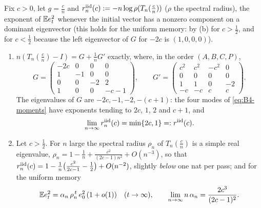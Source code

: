 \begin{proposition}\label{prop:B4-iid-limit}
Fix $c>0$, let $g=\frac cn$ and $r^{\rm iid}_n(c):=-n\log\rho(T_n(\frac cn))$ ($\rho$ the spectral radius), the exponent of $\mathbb{E} e_t^2$ whenever the initial vector has a nonzero component on a dominant eigenvector (this holds for the uniform memory: by (b) for $c>\frac12$, and for $c<\frac12$ because the left eigenvector of $G$ for $-2c$ is $(1,0,0,0)$).
\begin{enumerate}[label=(\alph*)]
\item $n(T_n(\frac cn)-I)=G+\frac1nG'$ exactly, where, in the order $(A,B,C,P)$,
\[
G=\begin{pmatrix}-2c&0&0&0\\1&-1&0&0\\0&0&-2&2\\1&0&0&-c-1\end{pmatrix},\qquad
G'=\begin{pmatrix}c^2&c^2&-c^2&0\\0&0&0&0\\1&1&0&-2\\-c&-c&c&c\end{pmatrix}.
\]
The eigenvalues of $G$ are $-2c,-1,-2,-(c+1)$: the four modes of \eqref{eq:B4-moments} have exponents tending to $2c$, $1$, $2$ and $c+1$, and
\[
\lim_{n\to\infty}r^{\rm iid}_n(c)=\min\{2c,1\}=:r^{\rm iid}(c).
\]
\item Let $c>\frac12$. For $n$ large the spectral radius $\rho_n$ of $T_n(\frac cn)$ is a simple real eigenvalue, $\rho_n=1-\frac1n+\frac{c^2}{(2c-1)n^2}+O(n^{-3})$, so that $r^{\rm iid}_n(c)=1-\frac1n\big(\frac{c^2}{2c-1}-\frac12\big)+O(n^{-2})$, slightly \emph{below} one nat per pass; and for the uniform memory
\begin{equation}\label{eq:B4-plateau}
\mathbb{E} e_t^2=\alpha_n\,\rho_n^{\,t}\,e_0^2\,(1+o(1))\quad(t\to\infty),\qquad \lim_{n\to\infty}n\,\alpha_n=\frac{2c^3}{(2c-1)^2} .
\end{equation}
\end{enumerate}
\end{proposition}
